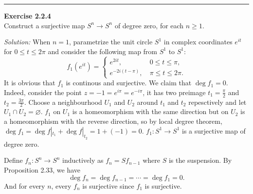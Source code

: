\documentclass[a4paper, 12pt]{article}
\newenvironment{problem}[2][Exercise]
    { \begin{mdframed}[backgroundcolor=gray!20] \textbf{#1 #2} \\}
    {  \end{mdframed}}
\newenvironment{solution}
    {\textit{Solution:}}
    {}
\begin{document}
\noindent\rule{7in}{2.8pt}
\begin{problem}{2.2.4}
Construct a surjective map \(S^n\rightarrow S^n\) of degree zero, for each \(n\geq 1\).
\end{problem}
\begin{solution}
When \(n=1\), parametrize the unit circle \(S^1\) in complex coordinates \(e^{i t}\) for \(0\leq t\leq 2\pi\) and consider the following map from \(S^1\) to \(S^1\):
\[f_1(e^{i t})=\begin{cases}
    e^{2 i t},&\  0\leq t\leq \pi,\\ 
    e^{-2i(t-\pi)},&\ \pi\leq t\leq 2\pi.
\end{cases}\]
It is obvious that \(f_1\) is continous and surjective. We claim that \(\deg f_1=0\). Indeed, consider the point \(z=-1=e^{i\pi}=e^{-i\pi}\), it has two preimage \(t_1=\frac{\pi}{2}\) and \(t_2=\frac{3\pi}{2}\). 
Choose a neighbourhood \(U_1\) and \(U_2\) around \(t_1\) and \(t_2\) repesctively and let \(U_1\cap U_2=\varnothing \). \(f_1\) on \(U_1\) is a homeomorphism with the same direction but on \(U_2\) is a homeomorphism with 
the reverse direction, so by local degree theorem, \(\deg f_1=\deg f|_{t_1}+\deg f|_{t_2}=1+(-1)=0\). \(f_1:S^1\rightarrow S^1\) is a surjective map of degree zero.

Define \(f_n:S^n\rightarrow S^n\) inductively as \(f_n=Sf_{n-1}\) where \(S\) is the suspension. By Proposition 2.33, we have
\[\deg f_n=\deg f_{n-1}=\cdots=\deg f_1=0.\] 
And for every \(n\), every \(f_n\) is surjective since \(f_1\) is surjective.
\end{solution}
\end{document}
